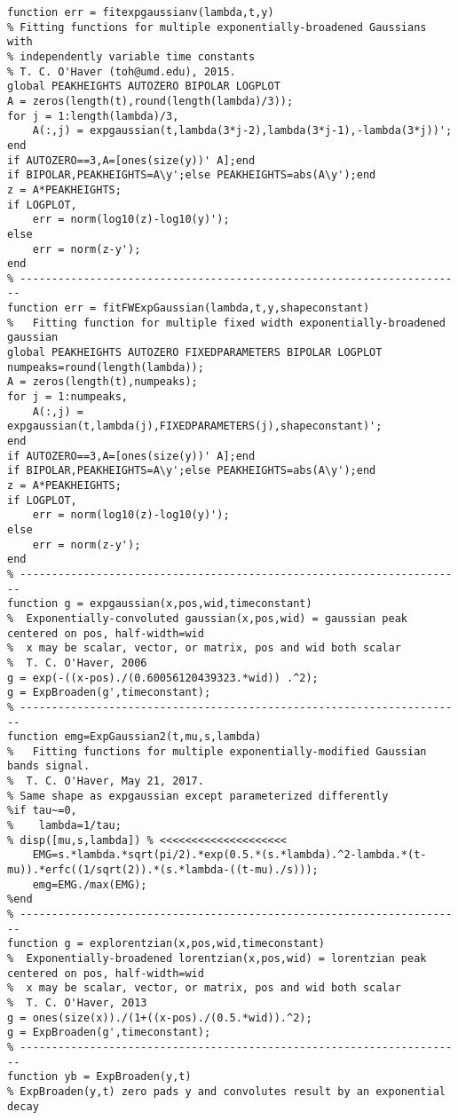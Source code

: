 \begin{lstlisting}
function err = fitexpgaussianv(lambda,t,y)
% Fitting functions for multiple exponentially-broadened Gaussians with
% independently variable time constants
% T. C. O'Haver (toh@umd.edu), 2015.
global PEAKHEIGHTS AUTOZERO BIPOLAR LOGPLOT
A = zeros(length(t),round(length(lambda)/3));
for j = 1:length(lambda)/3,
    A(:,j) = expgaussian(t,lambda(3*j-2),lambda(3*j-1),-lambda(3*j))';
end
if AUTOZERO==3,A=[ones(size(y))' A];end
if BIPOLAR,PEAKHEIGHTS=A\y';else PEAKHEIGHTS=abs(A\y');end
z = A*PEAKHEIGHTS;
if LOGPLOT,
    err = norm(log10(z)-log10(y)');
else
    err = norm(z-y');
end
% ----------------------------------------------------------------------
function err = fitFWExpGaussian(lambda,t,y,shapeconstant)
%	Fitting function for multiple fixed width exponentially-broadened gaussian
global PEAKHEIGHTS AUTOZERO FIXEDPARAMETERS BIPOLAR LOGPLOT
numpeaks=round(length(lambda));
A = zeros(length(t),numpeaks);
for j = 1:numpeaks,
    A(:,j) = expgaussian(t,lambda(j),FIXEDPARAMETERS(j),shapeconstant)';
end
if AUTOZERO==3,A=[ones(size(y))' A];end
if BIPOLAR,PEAKHEIGHTS=A\y';else PEAKHEIGHTS=abs(A\y');end
z = A*PEAKHEIGHTS;
if LOGPLOT,
    err = norm(log10(z)-log10(y)');
else
    err = norm(z-y');
end
% ----------------------------------------------------------------------
function g = expgaussian(x,pos,wid,timeconstant)
%  Exponentially-convoluted gaussian(x,pos,wid) = gaussian peak centered on pos, half-width=wid
%  x may be scalar, vector, or matrix, pos and wid both scalar
%  T. C. O'Haver, 2006
g = exp(-((x-pos)./(0.60056120439323.*wid)) .^2);
g = ExpBroaden(g',timeconstant);
% ----------------------------------------------------------------------
function emg=ExpGaussian2(t,mu,s,lambda)
%   Fitting functions for multiple exponentially-modified Gaussian bands signal.
%  T. C. O'Haver, May 21, 2017.
% Same shape as expgaussian except parameterized differently
%if tau~=0,
%    lambda=1/tau;
% disp([mu,s,lambda]) % <<<<<<<<<<<<<<<<<<<<
    EMG=s.*lambda.*sqrt(pi/2).*exp(0.5.*(s.*lambda).^2-lambda.*(t-mu)).*erfc((1/sqrt(2)).*(s.*lambda-((t-mu)./s)));
    emg=EMG./max(EMG);
%end
% ----------------------------------------------------------------------
function g = explorentzian(x,pos,wid,timeconstant)
%  Exponentially-broadened lorentzian(x,pos,wid) = lorentzian peak centered on pos, half-width=wid
%  x may be scalar, vector, or matrix, pos and wid both scalar
%  T. C. O'Haver, 2013
g = ones(size(x))./(1+((x-pos)./(0.5.*wid)).^2);
g = ExpBroaden(g',timeconstant);
% ----------------------------------------------------------------------
function yb = ExpBroaden(y,t)
% ExpBroaden(y,t) zero pads y and convolutes result by an exponential decay

\end{lstlisting}
